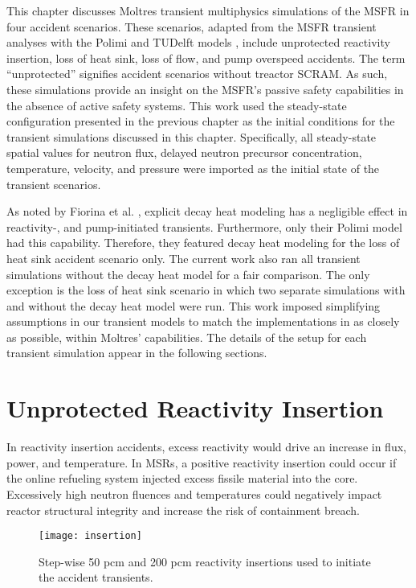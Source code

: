 This chapter discusses Moltres transient multiphysics simulations of the
\gls{MSFR} in four accident scenarios. These scenarios, adapted from the
\gls{MSFR} transient analyses with the Polimi and TUDelft models
\cite{fiorina_modelling_2014}, include unprotected reactivity
insertion, loss of heat sink, loss of flow, and pump overspeed accidents. The
term ``unprotected'' signifies accident scenarios without treactor SCRAM. As
such, these simulations provide an insight on the
\gls{MSFR}'s passive safety capabilities in the absence
of active safety systems. This work used the steady-state configuration
presented in the previous chapter as the initial conditions for the transient
simulations discussed in this chapter. Specifically, all steady-state spatial
values for neutron flux, delayed neutron precursor concentration, temperature,
velocity, and pressure were imported as the initial state of the transient
scenarios.

As noted by Fiorina et al. \cite{fiorina_modelling_2014}, explicit decay heat
modeling has a negligible effect in reactivity-, and pump-initiated
transients. Furthermore, only their Polimi model had this capability.
Therefore, they featured decay heat modeling for the loss of heat sink
accident scenario only. The current work also ran all transient simulations
without the decay heat model for a fair comparison. The only exception is the
loss of heat sink scenario in which two separate simulations with and without
the decay heat model were run. This work imposed simplifying assumptions in
our transient models to match the implementations in
\cite{fiorina_modelling_2014} as closely as possible, within Moltres'
capabilities. The details of the setup for each
transient simulation appear in the following sections.

\section{Unprotected Reactivity Insertion}
In reactivity insertion accidents, excess reactivity would drive an increase
in flux, power, and temperature. In
\glspl{MSR}, a positive reactivity insertion could occur if the online
refueling system injected excess fissile material into the core. Excessively
high neutron fluences and temperatures could negatively impact reactor
structural integrity and increase the risk of containment breach.

\begin{figure}[htbp!]
    \centering
    \texttt{[image: insertion]}
    \caption{Step-wise 50 pcm and 200 pcm reactivity insertions used to
    initiate the accident transients.}
    \label{fig:insertion}
\end{figure}

